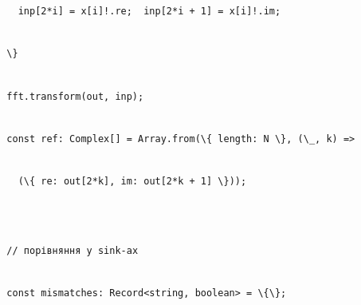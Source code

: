 \documentclass[
]{article}
\newcommand{\passthrough}[1]{#1}
\begin{document}
\passthrough{\lstinline!    !}\passthrough{\lstinline!inp!}\passthrough{\lstinline![2*i]!}\passthrough{\lstinline! !}\passthrough{\lstinline!=!}\passthrough{\lstinline! !}\passthrough{\lstinline"x[i]!.re;"}\passthrough{\lstinline!  !}\passthrough{\lstinline!inp!}\passthrough{\lstinline![2*i!}\passthrough{\lstinline! !}\passthrough{\lstinline!+!}\passthrough{\lstinline! !}\passthrough{\lstinline!1]!}\passthrough{\lstinline! !}\passthrough{\lstinline!=!}\passthrough{\lstinline! !}\passthrough{\lstinline"x[i]!.im;"}\strut \\
\passthrough{\lstinline!  !}\passthrough{\lstinline!\}!}\strut \\
\passthrough{\lstinline!  !}\passthrough{\lstinline!fft.transform!}\passthrough{\lstinline!(out,!}\passthrough{\lstinline! !}\passthrough{\lstinline!inp!}\passthrough{\lstinline!);!}\strut \\
\passthrough{\lstinline!  !}\passthrough{\lstinline!const!}\passthrough{\lstinline! !}\passthrough{\lstinline!ref:!}\passthrough{\lstinline! !}\passthrough{\lstinline!Complex[]!}\passthrough{\lstinline! !}\passthrough{\lstinline!=!}\passthrough{\lstinline! !}\passthrough{\lstinline!Array.from!}\passthrough{\lstinline!(\{!}\passthrough{\lstinline! !}\passthrough{\lstinline!length:!}\passthrough{\lstinline! !}\passthrough{\lstinline!N!}\passthrough{\lstinline! !}\passthrough{\lstinline!\},!}\passthrough{\lstinline! !}\passthrough{\lstinline!(\_,!}\passthrough{\lstinline! !}\passthrough{\lstinline!k)!}\passthrough{\lstinline! !}\passthrough{\lstinline!=>!}\strut \\
\passthrough{\lstinline!    !}\passthrough{\lstinline!(\{!}\passthrough{\lstinline! !}\passthrough{\lstinline!re:!}\passthrough{\lstinline! !}\passthrough{\lstinline!out[2*k],!}\passthrough{\lstinline! !}\passthrough{\lstinline!im:!}\passthrough{\lstinline! !}\passthrough{\lstinline!out[2*k!}\passthrough{\lstinline! !}\passthrough{\lstinline!+!}\passthrough{\lstinline! !}\passthrough{\lstinline!1]!}\passthrough{\lstinline! !}\passthrough{\lstinline!\}));!}\strut \\
\strut \\
\passthrough{\lstinline!  !}\passthrough{\lstinline!//!}\passthrough{\lstinline! !}\passthrough{\lstinline!порівняння!}\passthrough{\lstinline! !}\passthrough{\lstinline!у!}\passthrough{\lstinline! !}\passthrough{\lstinline!sink-!}\passthrough{\lstinline!ах!}\strut \\
\passthrough{\lstinline!  !}\passthrough{\lstinline!const!}\passthrough{\lstinline! !}\passthrough{\lstinline!mismatches:!}\passthrough{\lstinline! !}\passthrough{\lstinline!Record<string,!}\passthrough{\lstinline! !}\passthrough{\lstinline!boolean>!}\passthrough{\lstinline! !}\passthrough{\lstinline!=!}\passthrough{\lstinline! !}\passthrough{\lstinline!\{\};!}\strut \\
\end{document}
